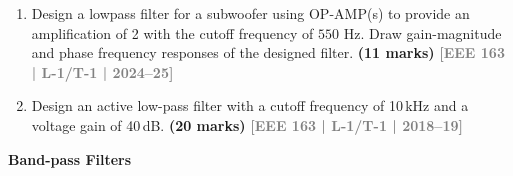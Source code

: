 \documentclass[12pt,a3paper]{article}
\newcommand{\yr}[1]{\hfill\textcolor{gray}{\small\textbf{[#1]}}}
\newcommand{\mk}[1]{\textcolor{orange!70!black}{\small\textbf{(#1 marks)}}}
\newcommand{\subtopic}[2]{%
  \vspace{10pt}
  \noindent\begin{tcolorbox}[colback=#1!8,colframe=#1,boxrule=0.6pt,arc=4pt,
    left=6pt,right=6pt,top=4pt,bottom=4pt]
    \small\bfseries\textcolor{#1}{#2}
  \end{tcolorbox}
  \vspace{2pt}
}
\begin{document}
\begin{enumerate}

\item Design a lowpass filter for a subwoofer using OP-AMP(s) to provide an 
amplification of 2 with the cutoff frequency of $550 \text{ Hz}$. Draw gain-magnitude and 
phase frequency responses of the designed filter.
\mk{11} \yr{EEE 163 | L-1/T-1 | 2024--25}
  
\item Design an active low-pass filter with a cutoff frequency of 10\,kHz and a voltage gain of 40\,dB.
\mk{20} \yr{EEE 163 | L-1/T-1 | 2018--19}

\end{enumerate}

\subtopic{cE}{Band-pass Filters}
\label{sub:s4-filters}
\end{document}
